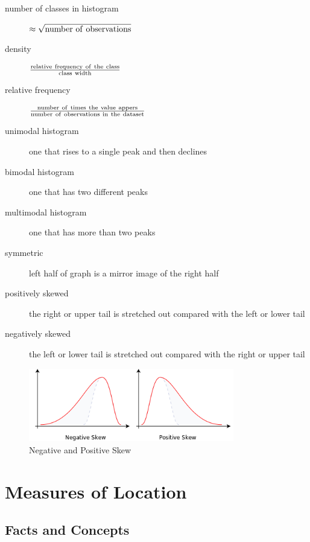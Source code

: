 \begin{description}
	\item[number of classes in histogram] $\rm\approx \sqrt{number\ of\ observations}$
	\item[density] $\rm\frac{relative\ frequency\ of\ the\ class}{class\ width}$
	\item[relative frequency] $\rm\frac{number\ of\ times\ the\ value\ appers}{number\ of\ observations\ in\ the\ dataset}$
	\item[unimodal histogram] one that rises to a single peak and then declines
	\item[bimodal histogram] one that has two different peaks
	\item[multimodal histogram] one that has more than two peaks
	\item[symmetric] left half of graph is a mirror image of the right half
	\item[positively skewed] the right or upper tail is stretched out compared with the left or lower tail
	\item[negatively skewed] the left or lower tail is stretched out compared with the right or upper tail
\end{description}

\begin{figure}[H]
	\centering
	\small
	\includegraphics[width=0.8\textwidth]{img/1-negative-positive-skew}
	\caption{Negative and Positive Skew}
	\label{fig:1}
\end{figure}

\section{Measures of Location}

\subsection{Facts and Concepts}

